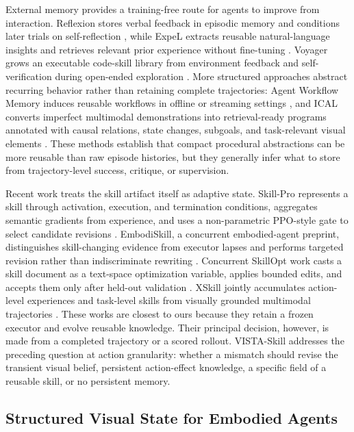 External memory provides a training-free route for agents to improve from interaction. Reflexion stores verbal feedback in episodic memory and conditions later trials on self-reflection \cite{shinnReflexionLanguageAgents2023a}, while ExpeL extracts reusable natural-language insights and retrieves relevant prior experience without fine-tuning \cite{zhaoExpeLLLMAgents2024}. Voyager grows an executable code-skill library from environment feedback and self-verification during open-ended exploration \cite{wangVoyagerOpenEndedEmbodied2024}. More structured approaches abstract recurring behavior rather than retaining complete trajectories: Agent Workflow Memory induces reusable workflows in offline or streaming settings \cite{wangAgentWorkflowMemory2025}, and ICAL converts imperfect multimodal demonstrations into retrieval-ready programs annotated with causal relations, state changes, subgoals, and task-relevant visual elements \cite{sarchVLMAgentsGenerate2024a}. These methods establish that compact procedural abstractions can be more reusable than raw episode histories, but they generally infer what to store from trajectory-level success, critique, or supervision.

Recent work treats the skill artifact itself as adaptive state. Skill-Pro represents a skill through activation, execution, and termination conditions, aggregates semantic gradients from experience, and uses a non-parametric PPO-style gate to select candidate revisions \cite{miSkillProLearningReusable2026}. EmbodiSkill, a concurrent embodied-agent preprint, distinguishes skill-changing evidence from executor lapses and performs targeted revision rather than indiscriminate rewriting \cite{juEmbodiSkillSkillAwareReflection2026}. Concurrent SkillOpt work casts a skill document as a text-space optimization variable, applies bounded edits, and accepts them only after held-out validation \cite{yangSkillOptExecutiveStrategy2026}. XSkill jointly accumulates action-level experiences and task-level skills from visually grounded multimodal trajectories \cite{jiangXSkillContinualLearning2026}. These works are closest to ours because they retain a frozen executor and evolve reusable knowledge. Their principal decision, however, is made from a completed trajectory or a scored rollout. VISTA-Skill addresses the preceding question at action granularity: whether a mismatch should revise the transient visual belief, persistent action-effect knowledge, a specific field of a reusable skill, or no persistent memory.

\subsection{Structured Visual State for Embodied Agents}

